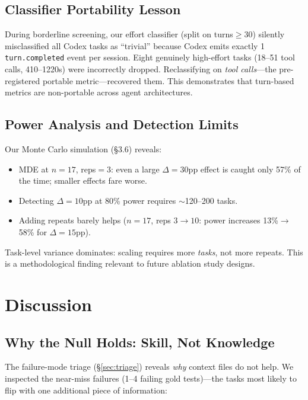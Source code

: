 \documentclass[11pt]{article}
\begin{document}
\subsection{Classifier Portability Lesson}
\label{sec:classifier}

During borderline screening, our effort classifier (split on turns${\geq}$30) silently misclassified all Codex tasks as ``trivial'' because Codex emits exactly 1 \texttt{turn.completed} event per session.
Eight genuinely high-effort tasks (18--51 tool calls, 410--1220s) were incorrectly dropped.
Reclassifying on \emph{tool calls}---the pre-registered portable metric---recovered them.
This demonstrates that turn-based metrics are non-portable across agent architectures.

\subsection{Power Analysis and Detection Limits}
\label{sec:power}

Our Monte Carlo simulation (\S3.6) reveals:
\begin{itemize}
    \item MDE at $n{=}17$, reps$=$3: even a large $\Delta{=}30$pp effect is caught only 57\% of the time; smaller effects fare worse.
    \item Detecting $\Delta{=}10$pp at 80\% power requires ${\sim}$120--200 tasks.
    \item Adding repeats barely helps ($n{=}17$, reps $3{\to}10$: power increases 13\%${\to}$58\% for $\Delta{=}15$pp).
\end{itemize}

Task-level variance dominates: scaling requires more \emph{tasks}, not more repeats.
This is a methodological finding relevant to future ablation study designs.

\section{Discussion}

\subsection{Why the Null Holds: Skill, Not Knowledge}

The failure-mode triage (\S\ref{sec:triage}) reveals \emph{why} context files do not help.
We inspected the near-miss failures (1--4 failing gold tests)---the tasks most likely to flip with one additional piece of information:
\end{document}
